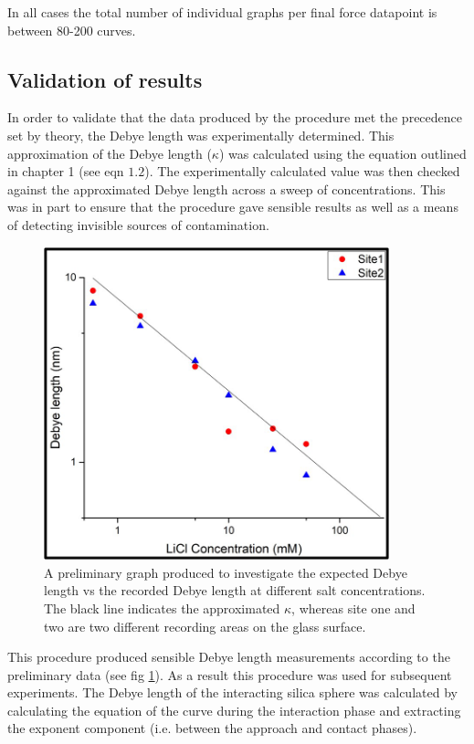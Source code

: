 In all cases the total number of individual graphs per final force datapoint is between 80-200 curves.

\subsection{Validation of results}

In order to validate that the data produced by the procedure met the precedence set by theory, the Debye length was experimentally determined. This approximation of the Debye length ($\kappa$) was calculated using the equation outlined in chapter 1 (see eqn $1.2$). The experimentally calculated value was then checked against the approximated Debye length across a sweep of concentrations. This was in part to ensure that the procedure gave sensible results as well as a means of detecting invisible sources of contamination.

\begin{figure}[h!!]    
        \begin{center}
          \includegraphics[width=100mm]{chapter4/DebyeLength.png}
\end{center}
\caption{A preliminary graph produced to investigate the expected Debye length vs the recorded Debye length at different salt concentrations. The black line indicates the approximated $\kappa$, whereas site one and two are two different recording areas on the glass surface.}
\label{fig:DebyeLength}                 
\end{figure}

This procedure produced sensible Debye length measurements according to the preliminary data (see fig \ref{fig:DebyeLength}). As a result this procedure was used for subsequent experiments. The Debye length of the interacting silica sphere was calculated by calculating the equation of the curve during the interaction phase and extracting the exponent component (i.e. between the approach and contact phases).

